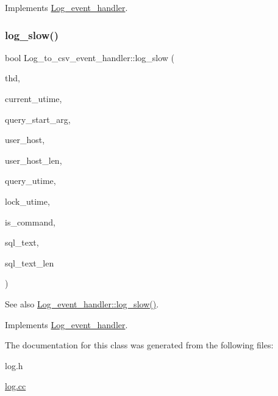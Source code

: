 Implements \mbox{\hyperlink{classLog__event__handler_aa9f98b8c0b48eb846877fe9d2496560e}{Log\+\_\+event\+\_\+handler}}.

\mbox{\label{classLog__to__csv__event__handler_a70587b1ff21463136fe16302d13b3740}} 
\subsubsection{\texorpdfstring{log\+\_\+slow()}{log\_slow()}}
{\footnotesize\ttfamily bool Log\+\_\+to\+\_\+csv\+\_\+event\+\_\+handler\+::log\+\_\+slow (\begin{DoxyParamCaption}\item[{T\+HD $\ast$}]{thd,  }\item[{ulonglong}]{current\+\_\+utime,  }\item[{ulonglong}]{query\+\_\+start\+\_\+arg,  }\item[{const char $\ast$}]{user\+\_\+host,  }\item[{size\+\_\+t}]{user\+\_\+host\+\_\+len,  }\item[{ulonglong}]{query\+\_\+utime,  }\item[{ulonglong}]{lock\+\_\+utime,  }\item[{bool}]{is\+\_\+command,  }\item[{const char $\ast$}]{sql\+\_\+text,  }\item[{size\+\_\+t}]{sql\+\_\+text\+\_\+len }\end{DoxyParamCaption})\hspace{0.3cm}{\ttfamily [virtual]}}

\begin{DoxySeeAlso}{See also}
\mbox{\hyperlink{classLog__event__handler_a4a391622d5b047d66ed8466ffa2af98b}{Log\+\_\+event\+\_\+handler\+::log\+\_\+slow()}}. 
\end{DoxySeeAlso}


Implements \mbox{\hyperlink{classLog__event__handler_a4a391622d5b047d66ed8466ffa2af98b}{Log\+\_\+event\+\_\+handler}}.



The documentation for this class was generated from the following files\+:\begin{DoxyCompactItemize}
\item 
log.\+h\item 
\mbox{\hyperlink{log_8cc}{log.\+cc}}\end{DoxyCompactItemize}
